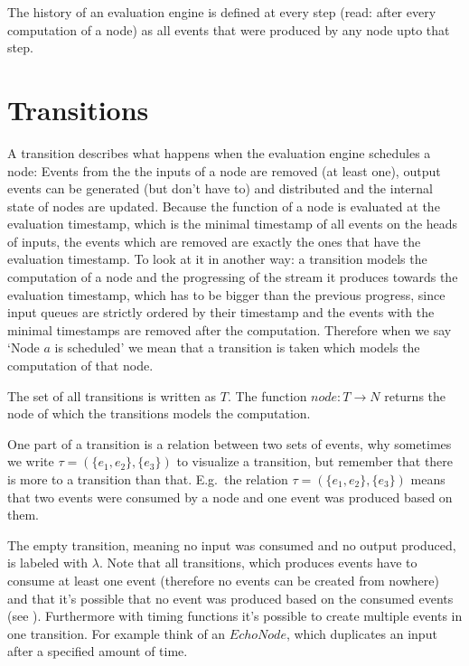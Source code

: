 The history of an evaluation engine is defined at every step (read: after every computation of a node) as all events that were produced by any node upto that step.

\section{Transitions}
\label{sec:definitions:transitions}

A transition describes what happens when the evaluation engine schedules a node:
Events from the the inputs of a node are removed (at least one), output events can be generated (but don't have to) and distributed and the internal state of nodes are updated.
Because the function of a node is evaluated at the evaluation timestamp, which is the minimal timestamp of all events on the heads of inputs, the events which are removed are exactly the ones that have the evaluation timestamp.
To look at it in another way: a transition models the computation of a node and the progressing of the stream it produces towards the evaluation timestamp, which has to be bigger than the previous progress, since input queues are strictly ordered by their timestamp and the events with the minimal timestamps are removed after the computation.
Therefore when we say `Node \(a\) is scheduled' we mean that a transition is taken which models the computation of that node.

The set of all transitions is written as \(T\).
The function \(\mathit{node} : T \rightarrow N\) returns the node of which the transitions models the computation.

One part of a transition is a relation between two sets of events, why sometimes we write \(\tau = (\{e_1, e_2\}, \{e_3\})\) to visualize a transition, but remember that there is more to a transition than that.
E.g.\ the relation \(\tau = (\{e_1,e_2\}, \{e_3\})\) means that two events were consumed by a node and one event was produced based on them.

The empty transition, meaning no input was consumed and no output produced, is labeled with \(\lambda\).
Note that all transitions, which produces events have to consume at least one event (therefore no events can be created from nowhere) and that it's possible that no event was produced based on the consumed events (see ).
Furthermore with timing functions it's possible to create multiple events in one transition.
For example think of an \(\mathit{EchoNode}\), which duplicates an input after a specified amount of time.

